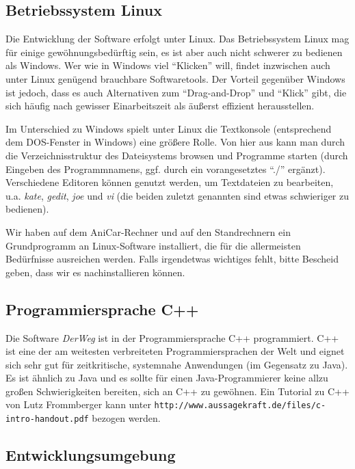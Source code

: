 \documentclass[a4paper, 11pt]{article}
\newcommand{\DerWeg}{\textit{DerWeg }}  %
\begin{document}
{\subsection{Betriebssystem Linux}

Die Entwicklung der Software erfolgt unter Linux. Das Betriebssystem Linux mag für einige gewöhnungsbedürftig sein, es ist aber auch nicht schwerer zu bedienen als Windows. Wer wie in Windows viel "`Klicken"' will, findet inzwischen auch unter Linux genügend brauchbare Softwaretools. Der Vorteil gegenüber Windows ist jedoch, dass es auch Alternativen zum "`Drag-and-Drop"' und "`Klick"' gibt, die sich häufig nach gewisser Einarbeitszeit als äußerst effizient herausstellen.

Im Unterschied zu Windows spielt unter Linux die Textkonsole (entsprechend dem DOS-Fenster in Windows) eine größere Rolle. Von hier aus kann man durch die Verzeichnisstruktur des Dateisystems browsen und Programme starten (durch Eingeben des Programmnamens, ggf. durch ein vorangesetztes "`./"' ergänzt). Verschiedene Editoren können genutzt werden, um Textdateien zu bearbeiten, u.a. \textit{kate}, \textit{gedit}, \textit{joe} und \textit{vi} (die beiden zuletzt genannten sind etwas schwieriger zu bedienen).

Wir haben auf dem AniCar-Rechner und auf den Standrechnern ein Grundprogramm an Linux-Software installiert, die für die allermeisten Bedürfnisse ausreichen werden. Falls irgendetwas wichtiges fehlt, bitte Bescheid geben, dass wir es nachinstallieren können.

\subsection{Programmiersprache C++}

Die Software \DerWeg ist in der Programmiersprache C++ programmiert. C++ ist eine der am weitesten verbreiteten Programmiersprachen der Welt und eignet sich sehr gut für zeitkritische, systemnahe Anwendungen (im Gegensatz zu Java). Es ist ähnlich zu Java und es sollte für einen Java-Programmierer keine allzu großen Schwierigkeiten bereiten, sich an C++ zu gewöhnen. Ein Tutorial zu C++ von Lutz Frommberger kann unter \texttt{http://www.aussagekraft.de/files/c-intro-handout.pdf} 
bezogen werden.

\subsection{Entwicklungsumgebung}

}
\end{document}

